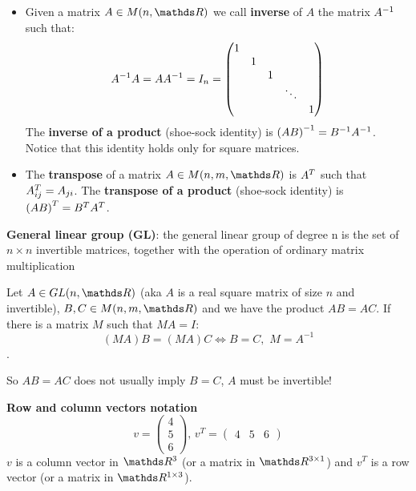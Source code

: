 \documentclass[computationalMathematics.tex]{subfiles}
\begin{document}
\begin{itemize}
     \item Given a matrix $A \in M(n, \R)$ we call \textbf{inverse} of $A$ the matrix ${A}^{-1}$ such that:
         $${A}^{-1} A = A {A}^{-1} = I_{n} =
         \begin{pmatrix}
                1\\
                & 1\\
                & & 1\\
                & & & \ddots\\
                & & & & 1
         \end{pmatrix}$$
         The \textbf{inverse of a product} (shoe-sock identity) is ${(A B)}^{-1} = {B}^{-1} {A}^{-1}$.
Notice that this identity holds only for square matrices.

     \item The \textbf{transpose} of a matrix $A \in M(n, m, \R)$ is ${A}^{T}$ such that ${A}^{T}_{ij} = A_{ji}$. The \textbf{transpose of a product} (shoe-sock identity) is ${(A B)}^{T} = {B}^{T} {A}^{T}$.

\end{itemize} 

\begin{definition}
  \textbf{General linear group (GL)}: the general linear group of degree n is the set of $n\times n$ invertible matrices, together with the operation of ordinary matrix multiplication
\end{definition}

\begin{proposition}
  Let $A \in GL(n, \R)$ (aka $A$ is a real square matrix of size $n$ and invertible), $B, C \in M(n, m, \R)$ and we have the product $AB = AC$. If there is a matrix $M$ such that $MA = I$: 
  $$(MA)B = (MA)C \Longleftrightarrow B=C, \,\, M = A^{-1}$$.
\end{proposition}
\noindent So $AB = AC$ does not usually imply $B = C$, $A$ must be invertible!\\

\begin{myframe}{\bf Row and column vectors notation}
        $$v =   \begin{pmatrix}
                    4\\
                    5\\
                    6
                \end{pmatrix},\,
          v^T = \begin{pmatrix}
                    4 & 5 & 6
          \end{pmatrix}$$
          $v$ is a column vector in $\R^3$ (or a matrix in $\R^{3 \times 1}$) and $v^T$ is a row vector (or a matrix in $\R^{1\times 3}$).
\end{myframe}
\end{document}
